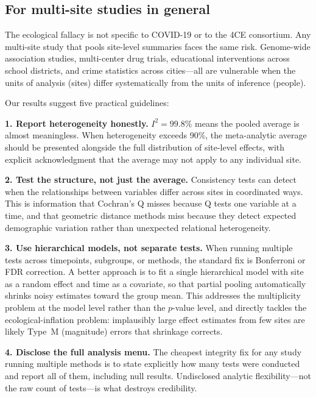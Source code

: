 \documentclass{article}
\begin{document}
\subsection{For multi-site studies in general}

The ecological fallacy is not specific to COVID-19 or to the 4CE consortium.
Any multi-site study that pools site-level summaries faces the same risk.
Genome-wide association studies, multi-center drug trials, educational
interventions across school districts, and crime statistics across
cities---all are vulnerable when the units of analysis (sites) differ
systematically from the units of inference (people).

Our results suggest five practical guidelines:

\textbf{1. Report heterogeneity honestly.}  $I^2 = 99.8\%$ means the pooled
average is almost meaningless.  When heterogeneity exceeds 90\%, the
meta-analytic average should be presented alongside the full distribution of
site-level effects, with explicit acknowledgment that the average may not
apply to any individual site.

\textbf{2. Test the structure, not just the average.}  Consistency tests can
detect when the relationships between variables differ across sites in
coordinated ways.  This is information that Cochran's Q misses because Q
tests one variable at a time, and that geometric distance methods miss
because they detect expected demographic variation rather than unexpected
relational heterogeneity.

\textbf{3. Use hierarchical models, not separate tests.}  When running
multiple tests across timepoints, subgroups, or methods, the standard fix is
Bonferroni or FDR correction.  A better approach is to fit a single
hierarchical model with site as a random effect and time as a covariate, so
that partial pooling automatically shrinks noisy estimates toward the group
mean.  This addresses the multiplicity problem at the model level rather than
the $p$-value level, and directly tackles the ecological-inflation problem:
implausibly large effect estimates from few sites are likely Type~M
(magnitude) errors that shrinkage corrects.

\textbf{4. Disclose the full analysis menu.}  The cheapest integrity fix for
any study running multiple methods is to state explicitly how many tests were
conducted and report all of them, including null results.  Undisclosed
analytic flexibility---not the raw count of tests---is what destroys
credibility.
\end{document}
